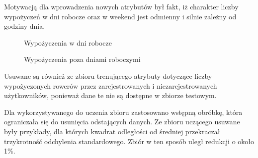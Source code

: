 \documentclass[a4paper,12pt]{article}
\begin{document}
Motywacją dla wprowadzenia nowych atrybutów był fakt, iż charakter liczby wypożyczeń w dni robocze oraz w weekend jest odmienny i silnie zależny od godziny dnia.

\begin{figure}[!htb]
    \center
    \caption{Wypożyczenia w dni robocze}
\end{figure}

\begin{figure}[!htb]
    \center
    \caption{Wypożyczenia poza dniami roboczymi}
\end{figure}
    
Usuwane są również ze zbioru trenującego atrybuty dotyczące liczby wypożyczonych rowerów przez zarejestrowanych i niezarejestrowanych użytkowników, ponieważ dane te nie są dostępne w zbiorze testowym.

Dla wykorzystywanego do uczenia zbioru zastosowano wstępną obróbkę, która ograniczała się do usunięcia odstających danych. Ze zbioru uczącego usuwane były przykłady, dla których kwadrat odległości od średniej przekraczał trzykrotność odchylenia standardowego. Zbiór w ten sposób uległ redukcji o około 1\%.
\end{document}
